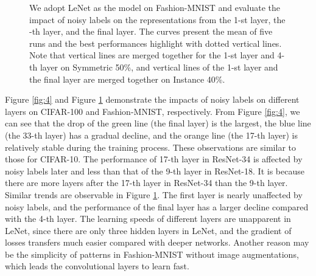 \documentclass[11pt]{article}
\begin{document}
\begin{figure}[!ht]
\centering
{}
\caption{We adopt LeNet as the model on Fashion-MNIST and evaluate the impact of noisy labels on the representations from the 1-st layer, the -th layer, and the final layer. The curves present the mean of five runs and the best performances highlight with dotted vertical lines. Note that vertical lines are merged together for the 1-st layer and 4-th layer on Symmetric 50\%, and vertical lines of the 1-st layer and the final layer are merged together on Instance 40\%.}
\label{fig:5}
\vspace{-10px}
\end{figure}


Figure \ref{fig:4} and Figure \ref{fig:5} demonstrate the impacts of noisy labels on different layers on CIFAR-100 and Fashion-MNIST, respectively. From Figure \ref{fig:4}, we can see that the drop of the green line (the final layer) is the largest, the blue line (the 33-th layer) has a gradual decline, and the orange line (the 17-th layer) is relatively stable during the training process. These observations are similar to those for CIFAR-10. The performance of 17-th layer in ResNet-34 is affected by noisy labels later and less than that of the 9-th layer in ResNet-18. It is because there are more layers after the 17-th layer in ResNet-34 than the 9-th layer. Similar trends are observable in Figure \ref{fig:5}. The first layer is nearly unaffected by noisy labels, and the performance of the final layer has a larger decline compared with the 4-th layer. The learning speeds of different layers are unapparent in LeNet, since there are only three hidden layers in LeNet, and the gradient of losses transfers much easier compared with deeper networks. Another reason may be the simplicity of patterns in Fashion-MNIST without image augmentations, which leads the convolutional layers to learn fast.
\end{document}
